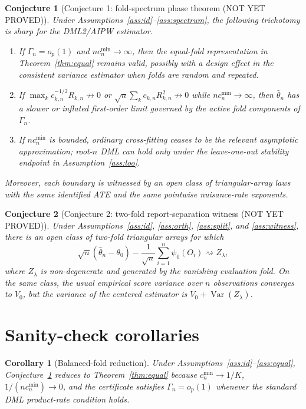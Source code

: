 \documentclass[11pt]{article}
\theoremstyle{definition}
\theoremstyle{plain}
\newtheorem{conjecture}{Conjecture}
\newtheorem{corollary}{Corollary}
\theoremstyle{remark}
\begin{document}
\begin{conjecture}[Conjecture 1: fold-spectrum phase theorem (NOT YET PROVED)]\label{conj:phase}
Under Assumptions~\ref{ass:id}--\ref{ass:spectrum}, the following trichotomy is sharp for the DML2/AIPW estimator.
\begin{enumerate}[label=(\roman*),leftmargin=*]
\item If \(\Gamma_n=o_p(1)\) and \(n c_n^{\min}\to\infty\), then the equal-fold representation in Theorem~\ref{thm:equal} remains valid, possibly with a design effect in the consistent variance estimator when folds are random and repeated.
\item If \(\max_k c_{k,n}^{-1/2}R_{k,n}\not\to0\) or \(\sqrt n\sum_k c_{k,n}R_{k,n}^2\not\to0\) while \(n c_n^{\min}\to\infty\), then \(\hat\theta_n\) has a slower or inflated first-order limit governed by the active fold components of \(\Gamma_n\).
\item If \(n c_n^{\min}\) is bounded, ordinary cross-fitting ceases to be the relevant asymptotic approximation; root-\(n\) DML can hold only under the leave-one-out stability endpoint in Assumption~\ref{ass:loo}.
\end{enumerate}
Moreover, each boundary is witnessed by an open class of triangular-array laws with the same identified ATE and the same pointwise nuisance-rate exponents.
\end{conjecture}

\begin{conjecture}[Conjecture 2: two-fold report-separation witness (NOT YET PROVED)]\label{conj:witness}
Under Assumptions~\ref{ass:id}, \ref{ass:orth}, \ref{ass:split}, and \ref{ass:witness}, there is an open class of two-fold triangular arrays for which
\[
  \sqrt n(\hat\theta_n-\theta_0)-\frac{1}{\sqrt n}\sum_{i=1}^n\psi_0(O_i)
  \rightsquigarrow Z_{\lambda},
\]
where \(Z_{\lambda}\) is non-degenerate and generated by the vanishing evaluation fold. On the same class, the usual empirical score variance over \(n\) observations converges to \(V_0\), but the variance of the centered estimator is \(V_0+\operatorname{Var}(Z_{\lambda})\).
\end{conjecture}

\section{Sanity-check corollaries}
\begin{corollary}[Balanced-fold reduction]\label{cor:balanced}
Under Assumptions~\ref{ass:id}--\ref{ass:equal}, Conjecture~\ref{conj:phase} reduces to Theorem~\ref{thm:equal} because \(c_n^{\min}\to1/K\), \(1/(n c_n^{\min})\to0\), and the certificate satisfies \(\Gamma_n=o_p(1)\) whenever the standard DML product-rate condition holds.
\end{corollary}
\end{document}
